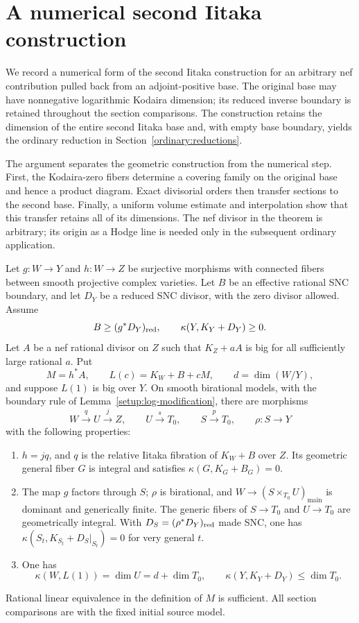 \section{A numerical second Iitaka construction}\label{num:second-base}

We record a numerical form of the second Iitaka construction for an
arbitrary nef contribution pulled back from an adjoint-positive base.
The original base may have nonnegative logarithmic Kodaira dimension;
its reduced inverse boundary is retained throughout the section
comparisons. The construction retains the dimension of the entire
second Iitaka base and, with empty base boundary, yields the ordinary
reduction in Section~\ref{ordinary:reductions}.

The argument separates the geometric construction from the numerical
step. First, the Kodaira-zero fibers determine a covering family on
the original base and hence a product diagram. Exact divisorial
orders then transfer sections to the second base. Finally, a uniform
volume estimate and interpolation show that this transfer retains
all of its dimensions. The nef divisor in the theorem is arbitrary;
its origin as a Hodge line is needed only in the subsequent ordinary
application.

\begin{theorem}
\label{num:main}
Let $g:W\to Y$ and $h:W\to Z$ be surjective morphisms with connected
fibers between smooth projective complex varieties.  Let $B$ be an
effective rational SNC boundary, and let $D_Y$ be a reduced SNC
divisor, with the zero divisor allowed. Assume
\[
 B\geq(g^*D_Y)_{\mathrm{red}},\qquad
 \kappa(Y,K_Y+D_Y)\geq0.
\]
Let $A$ be a nef rational divisor on $Z$ such that $K_Z+aA$ is big
for all sufficiently large rational $a$.  Put
\[
 M=h^*A,\qquad L(c)=K_W+B+cM,\qquad d=\dim(W/Y),
\]
and suppose $L(1)$ is big over $Y$.
On smooth birational models, with the boundary rule of
Lemma~\ref{setup:log-modification}, there are morphisms
\[
 W\xrightarrow{q}U\xrightarrow{j}Z,
 \qquad U\xrightarrow{s}T_0,\qquad S\xrightarrow{p}T_0,
 \qquad \rho:S\to Y
\]
with the following properties:
\begin{enumerate}
\item $h=jq$, and $q$ is the relative Iitaka fibration of $K_W+B$
over $Z$.  Its geometric general fiber $G$ is integral and satisfies
$\kappa(G,K_G+B_G)=0$.
\item The map $g$ factors through $S$; $\rho$ is birational, and
$W\to(S\times_{T_0}U)_{\mathrm{main}}$ is dominant and generically
finite.  The generic fibers of $S\to T_0$ and $U\to T_0$ are
geometrically integral. With $D_S=(\rho^*D_Y)_{\mathrm{red}}$ made SNC,
one has $\kappa(S_t,K_{S_t}+D_S|_{S_t})=0$ for very general $t$.
\item One has
\begin{equation}\label{num:dimension-conclusion}
 \kappa(W,L(1))=\dim U=d+\dim T_0,
 \qquad \kappa(Y,K_Y+D_Y)\leq\dim T_0.
\end{equation}
\end{enumerate}
Rational linear equivalence in the definition of $M$ is sufficient.
All section comparisons are with the fixed initial source model.
\end{theorem}

